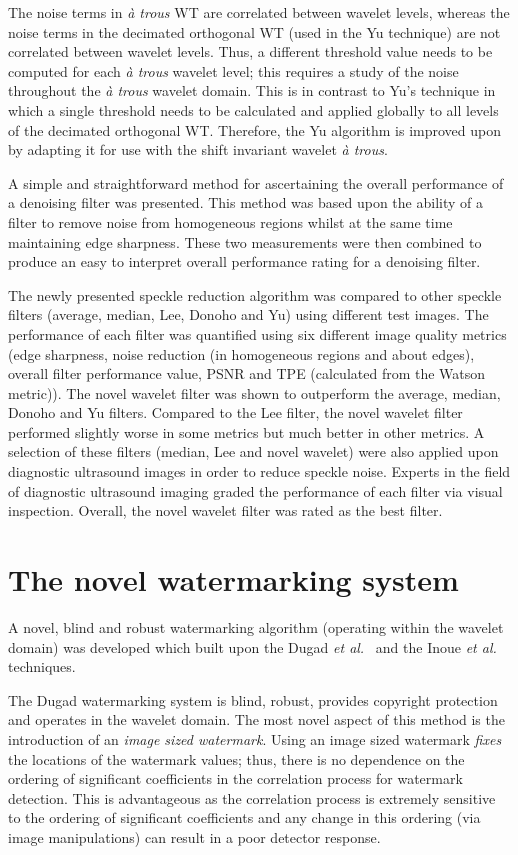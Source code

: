 \documentclass[12pt]{report}
\begin{document}
The noise terms in \emph{\`a trous} WT are correlated between wavelet levels, whereas the noise
terms in the decimated orthogonal WT (used in the Yu technique) are not correlated between wavelet levels.
Thus, a different threshold value needs to be computed for each \emph{\`a trous} wavelet level; this requires a study of the
noise throughout the \emph{\`a trous} wavelet domain.
This is in contrast to Yu's technique in which a single threshold needs to be calculated and applied globally to all levels of the decimated orthogonal WT.
Therefore, the Yu algorithm is improved upon by adapting it for use with the shift invariant wavelet \emph{\`a trous}.

A simple and straightforward method for ascertaining the overall performance of a denoising filter was presented. 
This method was based upon the ability of a filter to remove noise from homogeneous regions whilst at the same time maintaining edge sharpness.
These two measurements were then combined to produce an easy to interpret overall performance rating for a denoising filter.

The newly presented speckle reduction algorithm was compared to other speckle filters (average, median, Lee, Donoho and Yu) using different test images.
The performance of each filter was quantified using six different image quality metrics (edge sharpness, noise reduction
(in homogeneous regions and about edges), overall filter performance value, PSNR and TPE (calculated from the Watson metric)).
The novel wavelet filter was shown to outperform the average, median, Donoho and Yu filters. Compared to the Lee
filter, the novel wavelet filter performed slightly worse in some metrics but much better in other metrics.
A selection of these filters (median, Lee and novel wavelet) were also applied upon diagnostic ultrasound 
images in order to reduce speckle noise. Experts in the field of diagnostic ultrasound
imaging graded the performance of each filter via visual inspection. 
Overall, the novel wavelet filter was rated as the best filter.

\section{The novel watermarking system}
A novel, blind and robust watermarking algorithm (operating within the wavelet domain) was developed which built upon 
the Dugad \emph{et al.}~\cite{dugadDI} and the Inoue \emph{et al.}~\cite{inoueDI} techniques.

The Dugad watermarking system is blind, robust, provides copyright protection and 
operates in the wavelet domain. The most novel aspect of this method is the 
introduction of an \emph{image sized watermark}. Using an image sized watermark
\emph{fixes} the locations of the watermark values; thus, there is no dependence 
on the ordering of significant coefficients in the correlation process for 
watermark detection. This is advantageous as the correlation process is extremely
sensitive to the ordering of significant coefficients and any change in this
ordering (via image manipulations) can result in a poor detector response.
\end{document}
